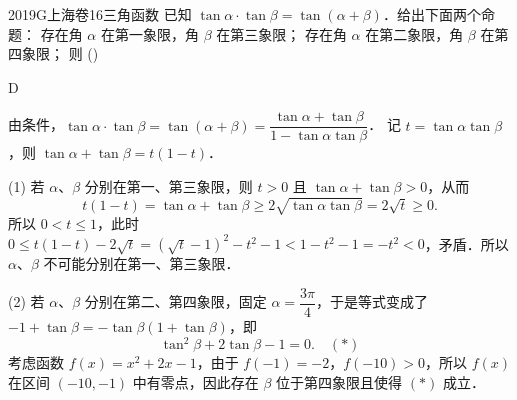 
\begin{problem}{2019}{G}{上海卷}{16}{三角函数}
已知 $\tan\alpha\cdot\tan\beta=\tan(\alpha+\beta)$．给出下面两个命题：  
存在角 $\alpha$ 在第一象限，角 $\beta$ 在第三象限；  
存在角 $\alpha$ 在第二象限，角 $\beta$ 在第四象限；  
则 (\hspace{1cm})
\begin{choices}
\end{choices}
\end{problem}

\begin{answer}
D
\end{answer}

\begin{solutions}
 由条件，$\tan\alpha\cdot\tan\beta=\tan(\alpha+\beta)=\dfrac{\tan\alpha+\tan\beta}{1-\tan\alpha\tan\beta}$．  
记 $t=\tan\alpha\tan\beta$，则 $\tan\alpha+\tan\beta=t(1-t)$．  

(1) 若 $\alpha$、$\beta$ 分别在第一、第三象限，则 $t>0$ 且 $\tan\alpha+\tan\beta>0$，从而  
$$
t(1-t)=\tan\alpha+\tan\beta\geq 2\sqrt{\tan\alpha\tan\beta}=2\sqrt{t}\geq 0.
$$  
所以 $0<t\leq 1$，此时 $0\leq t(1-t)-2\sqrt{t}=(\sqrt{t}-1)^2-t^2-1<1-t^2-1=-t^2<0$，矛盾．所以 $\alpha$、$\beta$ 不可能分别在第一、第三象限．  

(2) 若 $\alpha$、$\beta$ 分别在第二、第四象限，固定 $\alpha=\dfrac{3\pi}{4}$，于是等式变成了 $-1+\tan\beta=-\tan\beta(1+\tan\beta)$，即  
$$
\tan^2\beta+2\tan\beta-1=0.\quad (*)
$$  
考虑函数 $f(x)=x^2+2x-1$，由于 $f(-1)=-2$，$f(-10)>0$，所以 $f(x)$ 在区间 $(-10,-1)$ 中有零点，因此存在 $\beta$ 位于第四象限且使得 $(*)$ 成立．
\end{solutions}